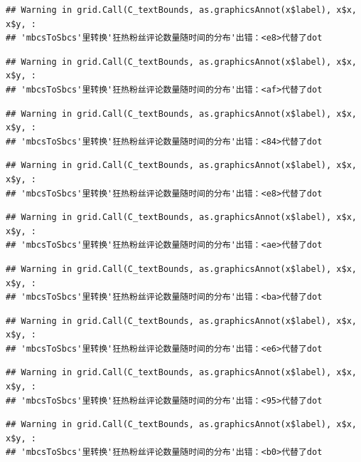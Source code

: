 \documentclass[
]{article}
\begin{document}
\begin{verbatim}
## Warning in grid.Call(C_textBounds, as.graphicsAnnot(x$label), x$x, x$y, :
## 'mbcsToSbcs'里转换'狂热粉丝评论数量随时间的分布'出错：<e8>代替了dot
\end{verbatim}

\begin{verbatim}
## Warning in grid.Call(C_textBounds, as.graphicsAnnot(x$label), x$x, x$y, :
## 'mbcsToSbcs'里转换'狂热粉丝评论数量随时间的分布'出错：<af>代替了dot
\end{verbatim}

\begin{verbatim}
## Warning in grid.Call(C_textBounds, as.graphicsAnnot(x$label), x$x, x$y, :
## 'mbcsToSbcs'里转换'狂热粉丝评论数量随时间的分布'出错：<84>代替了dot
\end{verbatim}

\begin{verbatim}
## Warning in grid.Call(C_textBounds, as.graphicsAnnot(x$label), x$x, x$y, :
## 'mbcsToSbcs'里转换'狂热粉丝评论数量随时间的分布'出错：<e8>代替了dot
\end{verbatim}

\begin{verbatim}
## Warning in grid.Call(C_textBounds, as.graphicsAnnot(x$label), x$x, x$y, :
## 'mbcsToSbcs'里转换'狂热粉丝评论数量随时间的分布'出错：<ae>代替了dot
\end{verbatim}

\begin{verbatim}
## Warning in grid.Call(C_textBounds, as.graphicsAnnot(x$label), x$x, x$y, :
## 'mbcsToSbcs'里转换'狂热粉丝评论数量随时间的分布'出错：<ba>代替了dot
\end{verbatim}

\begin{verbatim}
## Warning in grid.Call(C_textBounds, as.graphicsAnnot(x$label), x$x, x$y, :
## 'mbcsToSbcs'里转换'狂热粉丝评论数量随时间的分布'出错：<e6>代替了dot
\end{verbatim}

\begin{verbatim}
## Warning in grid.Call(C_textBounds, as.graphicsAnnot(x$label), x$x, x$y, :
## 'mbcsToSbcs'里转换'狂热粉丝评论数量随时间的分布'出错：<95>代替了dot
\end{verbatim}

\begin{verbatim}
## Warning in grid.Call(C_textBounds, as.graphicsAnnot(x$label), x$x, x$y, :
## 'mbcsToSbcs'里转换'狂热粉丝评论数量随时间的分布'出错：<b0>代替了dot
\end{verbatim}
\end{document}
